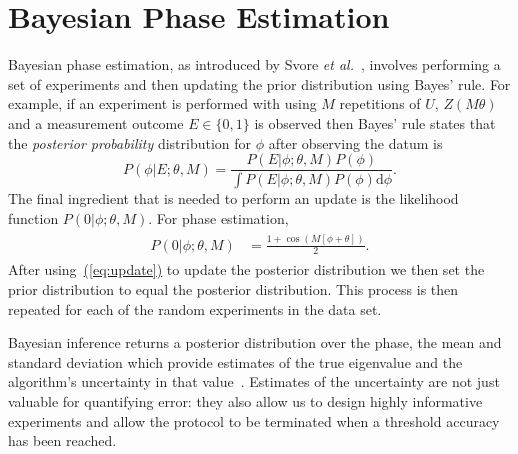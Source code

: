 \documentclass[aps,pra,amsmath,twocolumn,amssymb,superscriptaddress]{revtex4-1}
\newcommand{\eq}[1]{\hyperref[eq:#1]{(\ref*{eq:#1})}}
\newcommand{\etal}{\emph{et al.}}
\begin{document}
\section{Bayesian Phase Estimation}
\label{sec:bayesian-phase-est}


Bayesian phase estimation, as introduced by Svore \etal~\cite{SHF14}, involves performing a 
set of experiments and then updating the prior distribution using Bayes' rule.
For example, if an experiment is performed with using $M$ repetitions of $U$,
$Z(M \theta)$ and a measurement outcome $E\in \{0,1\}$ is observed then Bayes'
rule states that the \emph{posterior probability} distribution for $\phi$
after observing the datum is
\begin{equation}
P(\phi|E;\theta,M) = \frac{P(E|\phi;\theta,M)P(\phi)}{\int P(E|\phi;\theta,M)P(\phi)\mathrm{d}{\phi}}.\label{eq:update}
\end{equation}
The final ingredient that is needed to perform an update is the likelihood
function $P(0|\phi;\theta,M)$. For phase estimation,
\begin{gather}
    \label{eq:likenodecohere}
    \begin{aligned}
        P(0|\phi;\theta,M) & = \frac{1+\cos(M[\phi +\theta])}{2}.
    \end{aligned}
\end{gather}
After using~\eq{update} to update the posterior distribution we then set the prior distribution to equal the posterior distribution.  This process is then repeated for each of the random experiments in the data set.

Bayesian inference returns a posterior
distribution over the phase, the mean and standard deviation which
provide estimates of the true eigenvalue and the algorithm's
uncertainty in that value~\cite{granade_robust_2012,ferrie_high_2014}. Estimates of
the uncertainty are not just valuable for quantifying error: they also allow us to design highly informative experiments 
 and allow the protocol to be terminated when a threshold accuracy has been reached.
\end{document}
